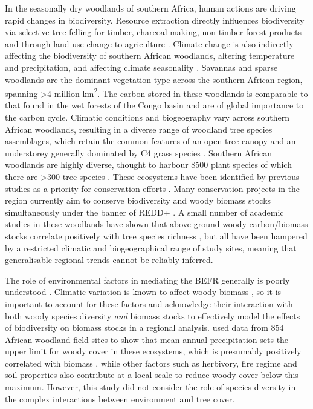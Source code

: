\documentclass[11pt,a4paper]{article}
\begin{document}
In the seasonally dry woodlands of southern Africa, human actions are driving rapid changes in biodiversity. Resource extraction directly influences biodiversity via selective tree-felling for timber, charcoal making, non-timber forest products and through land use change to agriculture \citep{Ryan2016}. Climate change is also indirectly affecting the biodiversity of southern African woodlands, altering temperature and precipitation, and affecting climate seasonality \citep{}. Savannas and sparse woodlands are the dominant vegetation type across the southern African region, spanning \textgreater{}4 million km\textsuperscript{2}. The carbon stored in these woodlands is comparable to that found in the wet forests of the Congo basin and are of global importance to the carbon cycle. Climatic conditions and biogeography vary across southern African woodlands, resulting in a diverse range of woodland tree species assemblages, which retain the common features of an open tree canopy and an understorey generally dominated by C4 grass species \citep{Frost1996}. Southern African woodlands are highly diverse, thought to harbour \textapprox{}8500 plant species of which there are \textgreater{}300 tree species \citep{Frost1996}. These ecosystems have been identified by previous studies as a priority for conservation efforts \citep{Brooks2006, Mittermeier2003, Frost1996}. Many conservation projects in the region currently aim to conserve biodiversity and woody biomass stocks simultaneously under the banner of REDD+ \citep{Hinsley2015}. A small number of academic studies in these woodlands have shown that above ground woody carbon/biomass stocks correlate positively with tree species richness \citep{McNicol2017, and, others}, but all have been hampered by a restricted climatic and biogeographical range of study sites, meaning that generalisable regional trends cannot be reliably inferred. \citet{Fayolle2018} 

The role of environmental factors in mediating the BEFR generally is poorly understood \citep{Ratcliffe2017}. Climatic variation is known to affect woody biomass \citep{Michaletz2014}, so it is important to account for these factors and acknowledge their interaction with both woody species diversity \textit{and} biomass stocks to effectively model the effects of biodiversity on biomass stocks in a regional analysis. \citet{Sankaran2005} used data from 854 African woodland field sites to show that mean annual precipitation sets the upper limit for woody cover in these ecosystems, which is presumably positively correlated with biomass \citep{}, while other factors such as herbivory, fire regime and soil properties also contribute at a local scale to reduce woody cover below this maximum. However, this study did not consider the role of species diversity in the complex interactions between environment and tree cover. 
\end{document}
